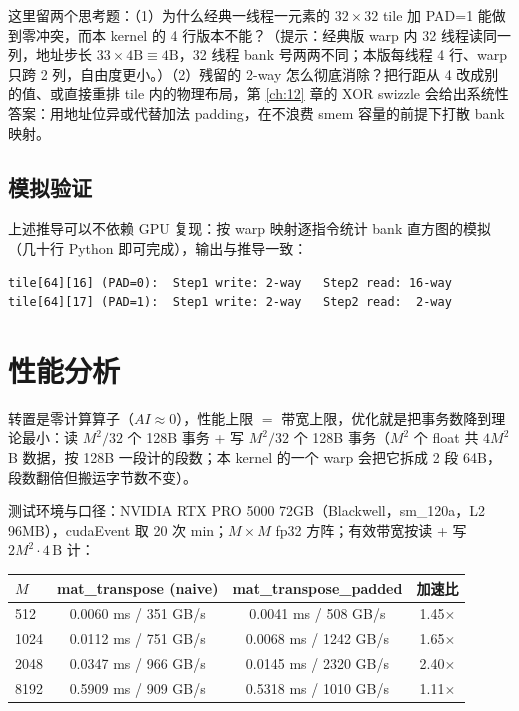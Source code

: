 这里留两个思考题：（1）为什么经典一线程一元素的 $32 \times 32$ tile 加 PAD=1 能做到零冲突，而本 kernel 的 4 行版本不能？（提示：经典版 warp 内 32 线程读同一列，地址步长 $33 \times 4\mathrm{B} \equiv 4\mathrm{B}$，32 线程 bank 号两两不同；本版每线程 4 行、warp 只跨 2 列，自由度更小。）（2）残留的 2-way 怎么彻底消除？把行距从 4 改成别的值、或直接重排 tile 内的物理布局，第 \ref{ch:12} 章的 XOR swizzle 会给出系统性答案：用地址位异或代替加法 padding，在不浪费 smem 容量的前提下打散 bank 映射。

\subsection{模拟验证}

上述推导可以不依赖 GPU 复现：按 warp 映射逐指令统计 bank 直方图的模拟（几十行 Python 即可完成），输出与推导一致：

\begin{lstlisting}[style=console]
tile[64][16] (PAD=0):  Step1 write: 2-way   Step2 read: 16-way
tile[64][17] (PAD=1):  Step1 write: 2-way   Step2 read:  2-way
\end{lstlisting}

\section{性能分析}

转置是零计算算子（$AI \approx 0$），性能上限 $=$ 带宽上限，优化就是把事务数降到理论最小：读 $M^2/32$ 个 128B 事务 + 写 $M^2/32$ 个 128B 事务（$M^2$ 个 float 共 $4M^2$ B 数据，按 128B 一段计的段数；本 kernel 的一个 warp 会把它拆成 2 段 64B，段数翻倍但搬运字节数不变）。

测试环境与口径：NVIDIA RTX PRO 5000 72GB（Blackwell，sm\_120a，L2 96MB），cudaEvent 取 20 次 min；$M \times M$ fp32 方阵；有效带宽按读 + 写 $2M^2 \cdot 4\,\mathrm{B}$ 计：

\begin{center}
\begin{tabular}{lccc}
\toprule
$M$ & mat\_transpose (naive) & mat\_transpose\_padded & 加速比 \\
\midrule
512  & 0.0060 ms / 351 GB/s  & 0.0041 ms / 508 GB/s   & 1.45$\times$ \\
1024 & 0.0112 ms / 751 GB/s  & 0.0068 ms / 1242 GB/s  & 1.65$\times$ \\
2048 & 0.0347 ms / 966 GB/s  & 0.0145 ms / 2320 GB/s  & 2.40$\times$ \\
8192 & 0.5909 ms / 909 GB/s  & 0.5318 ms / 1010 GB/s  & 1.11$\times$ \\
\bottomrule
\end{tabular}
\end{center}


